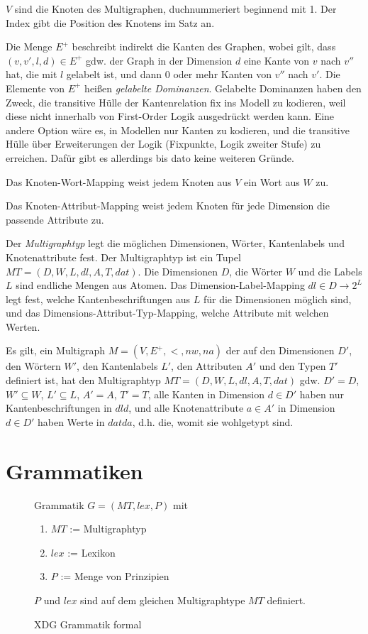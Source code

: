 $V$ sind die Knoten des Multigraphen, duchnummeriert beginnend mit
1. Der Index gibt die Position des Knotens im Satz an.

Die Menge $E^+$ beschreibt indirekt die Kanten des Graphen, wobei
gilt, dass $(v, v', l, d) \in E^+ $ gdw. der Graph in der Dimension $d$
eine Kante von $v$ nach $v''$ hat, die mit $l$ gelabelt ist, und dann 0
oder mehr Kanten von $v''$ nach $v'$. Die Elemente von $E^+$
hei{\ss}en \emph{gelabelte Dominanzen}. Gelabelte Dominanzen haben den
Zweck, die transitive H\"ulle der Kantenrelation fix ins Modell zu
kodieren, weil diese nicht innerhalb von First-Order Logik
ausgedr\"uckt werden kann. Eine andere Option w\"are es, in Modellen
nur Kanten zu kodieren, und die transitive H\"ulle \"uber
Erweiterungen der Logik (Fixpunkte, Logik zweiter Stufe) zu
erreichen. Daf\"ur gibt es allerdings bis dato keine weiteren
Gr\"unde.

Das Knoten-Wort-Mapping weist jedem Knoten aus $V$ ein Wort aus $W$ zu.

Das Knoten-Attribut-Mapping weist jedem Knoten f\"ur jede Dimension
die passende Attribute zu.

Der {\it Multigraphtyp} legt die m\"oglichen Dimensionen, W\"orter,
Kantenlabels und Knotenattribute fest. Der Multigraphtyp ist ein Tupel
$\mathit{MT} = (D,W,L,\mathit{dl},A,T,\mathit{dat})$. Die Dimensionen $D$, die W\"orter $W$ und die Labels
$L$ sind endliche Mengen aus Atomen. Das Dimension-Label-Mapping $\mathit{dl} \in
D \rightarrow 2^L$ legt fest, welche Kantenbeschriftungen aus $L$ f\"ur
die Dimensionen m\"oglich sind, und das
Dimensions-Attribut-Typ-Mapping, welche Attribute mit welchen Werten.

Es gilt, ein Multigraph $M = (V, E ^ + , < , \mathit{nw}, \mathit{na} )$ der auf den
Dimensionen $D'$, den W\"ortern $W'$, den Kantenlabels $L'$, den
Attributen $A'$ und den Typen $T'$ definiert ist, hat den
Multigraphtyp $\mathit{MT} = (D,W,L,\mathit{dl},A,T,\mathit{dat})$ gdw. $D'= D$, $W' \subseteq W$,
$L' \subseteq L$, $A' = A$, $T' = T$, alle Kanten in Dimension $d \in
D'$ haben nur Kantenbeschriftungen in $dl d$, und alle Knotenattribute
$a \in A'$ in Dimension $d \in D'$ haben Werte in $\mathit{dat} d a$, d.h. die,
womit sie wohlgetypt sind.

\section{Grammatiken}

\begin{figure}
Grammatik $G = (\mathit{MT}, \mathit{lex}, P)$ mit
\begin{enumerate}
  \item $\mathit{MT}$ := Multigraphtyp
  \item $\mathit{lex}$ := Lexikon
  \item $P$ := Menge von Prinzipien
\end{enumerate}
$P$ und $\mathit{lex}$ sind auf dem gleichen Multigraphtype $\mathit{MT}$ definiert.
\caption{XDG Grammatik formal}
\label{gramformal}
\end{figure}


